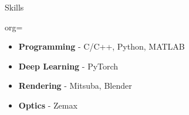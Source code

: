 \documentclass{resume}
\begin{document}
\begin{ResumeSection}{Skills}
    \newcommand{\skill}[2]{\textbf{#1} - #2}
    \begin{ResumeSubsection}{org=}
        \begin{itemize}
            \item \skill{Programming}{C/C++, Python, MATLAB}
            \item \skill{Deep Learning}{PyTorch}
            \item \skill{Rendering}{Mitsuba, Blender}
            \item \skill{Optics}{Zemax}
        \end{itemize}
    \end{ResumeSubsection}
\end{ResumeSection}
\vspace{-9pt}
\end{document}
